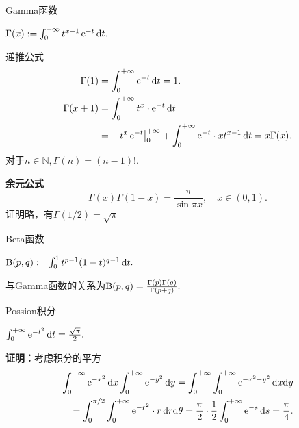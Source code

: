 \begin{example}{Gamma函数}{}
	\begin{center}
		$\Gamma(x):=\int_0^{+\infty} t^{x-1}\mathop{}\!\mathrm{e}^{-t}\mathop{}\!\mathrm{d} t.$
	\end{center}
	递推公式
	\begin{align*}
		\Gamma(1)   & =\int_0^{+\infty}\mathop{}\!\mathrm{e}^{-t}\mathop{}\!\mathrm{d} t=1.                                              \\
		\Gamma(x+1) & =\int_0^{+\infty} t^x\cdot\mathop{}\!\mathrm{e}^{-t}\mathop{}\!\mathrm{d} t                                        \\
					& =\left.-t^x\mathop{}\!\mathrm{e}^{-t}\right\rvert_0^{+\infty}+\int_0^{+\infty}\mathop{}\!\mathrm{e}^{-t}\cdot xt^{x-1}\mathop{}\!\mathrm{d} t=x\Gamma(x).
	\end{align*}
	对于$n\in\mathbb N,\Gamma(n)=(n-1)!.$

	\textbf{余元公式}
	\[
		\Gamma(x)\Gamma(1-x)=\frac{\pi}{\sin\pi x},\quad x\in(0,1).
	\]
	证明略，有$\Gamma(1/2)=\sqrt\pi$
\end{example}
\begin{example}{Beta函数}{}
	\begin{center}
		$\text B(p,q):=\int_0^1t^{p-1}(1-t)^{q-1}\mathop{}\!\mathrm{d} t.$ %
	\end{center}
	与Gamma函数的关系为$\text B(p,q)=\frac{\Gamma(p)\Gamma(q)}{\Gamma(p+q)}.$
\end{example}
\begin{example}{Possion积分}{}
	\begin{center}
		$\int_0^{+\infty}\mathop{}\!\mathrm{e}^{-t^2}\mathop{}\!\mathrm{d} t=\frac{\sqrt\pi}2.$
	\end{center}
	\textbf{证明：}考虑积分的平方
	\begin{align*}
		\int\zti\e{-x^2}\d x\int\zti\e{-y^2}\d y=\int\zti\int\zti\e{-x^2-y^2}\d x\nd y \\
		=\int_0^{\pi/2}\int\zti\e{-r^2}\cdot r\d r\nd\theta=\frac\pi{2}\cdot\frac12\int\zti\e{-s}\d s=\frac\pi{4}.
	\end{align*}
	\iffalse
		由$\ex>0,\forall x\in\RR$
		\[
			\iint_A\e{-x^2-y^2}\d x\nd y\leqslant\iint_B\e{-x^2-y^2}\d x\nd y\leqslant\iint_C\e{-x^2-y^2}\d x\nd y
		\]
		其中
		\begin{align*}
			B & =\{(x,y)~|~0\leqslant x\leqslant R,0\leqslant y\leqslant R\}, \\
			A & =\{(x,y)~|~x^2+y^2\leqslant R^2,x\geqslant 0,y\geqslant 0\},  \\
			C & =\{(x,y)~|~x^2+y^2\leqslant 2R^2,x\geqslant 0,y\geqslant 0\}.
		\end{align*}
		又
		\begin{align*}
			\iint_A\e{-x^2-y^2}\d x\nd y & =\int_0^{\pi/2}\int_0^R\e{-\rho^2}\rho\d\rho\d\varphi=\frac{\pi}4\left(1-\e{-R^2}\right), \\
			\iint_B\e{-x^2-y^2}\d x\nd y & =\int_0^R\int_0^R\e{-x^2}\e{-y^2}\d x\nd y=\left(\int_0^R\e{-t^2}\d t\right)^2,          \\
			\iint_C\e{-x^2-y^2}\d x\nd y & =\frac{\pi}4\left(1-\e{-2R^2}\right).
		\end{align*}
		当$R\to+\infty$，即得$\int\zti\e{-t^2}\d t=\frac{\sqrt\pi}2$.
	\fi
\end{example}
